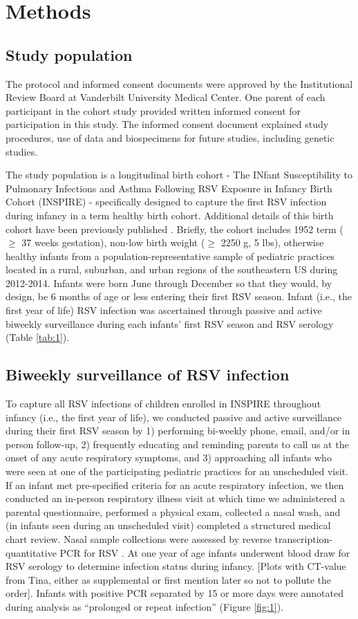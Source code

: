 \documentclass{article} %
\begin{document}
\section{Methods}
\subsection{Study population}
The protocol and informed consent documents were approved by the Institutional Review Board at Vanderbilt University Medical Center. 
One parent of each participant in the cohort study provided written informed consent for participation in this study. 
The informed consent document explained study procedures, use of data and biospecimens for future studies, including genetic studies.

The study population is a longitudinal birth cohort - The INfant Susceptibility to Pulmonary Infections and Asthma Following RSV Exposure in Infancy Birth Cohort (INSPIRE) - specifically designed to capture the first RSV infection during infancy in a term healthy birth cohort. 
Additional details of this birth cohort have been previously published 
\cite{larkin_objectives_2015}.
Briefly, the cohort includes 1952 term ($\ge$ 37 weeks gestation), non-low birth weight ($\ge$ 2250 g, 5 lbs), otherwise healthy infants from a population-representative sample of pediatric practices located in a rural, suburban, and urban regions of the southeastern US during 2012-2014. 
Infants were born June through December so that they would, by design, be 6 months of age or less entering their first RSV season. 
Infant (i.e., the first year of life) RSV infection was ascertained through passive and active biweekly surveillance during each infants' first RSV season and RSV serology
(Table \ref{tab:1}).

\subsection{Biweekly surveillance of RSV infection}
To capture all RSV infections of children enrolled in INSPIRE throughout infancy (i.e., the first year of life), we conducted passive and active surveillance during their first RSV season by 1) performing bi-weekly phone, email, and/or in person follow-up, 2) frequently educating and reminding parents to call us at the onset of any acute respiratory symptoms, and 3) approaching all infants who were seen at one of the participating pediatric practices for an unscheduled visit. 
If an infant met pre-specified criteria for an acute respiratory infection, we then conducted an in-person respiratory illness visit at which time we administered a parental questionnaire, performed a physical exam, collected a nasal wash, and (in infants seen during an unscheduled visit) completed a structured medical chart review.
Nasal sample collections were assessed by reverse transcription-quantitative PCR for RSV 
\cite{larkin2015objectives}.
At one year of age infants underwent blood draw for RSV serology to determine infection status during infancy. 
[Plots with CT-value from Tina, either as supplemental or first mention later so not to pollute the order].
Infants with positive PCR separated by 15 or more days were annotated during analysis as ``prolonged or repeat infection''
(Figure \ref{fig:1}).
\end{document}
